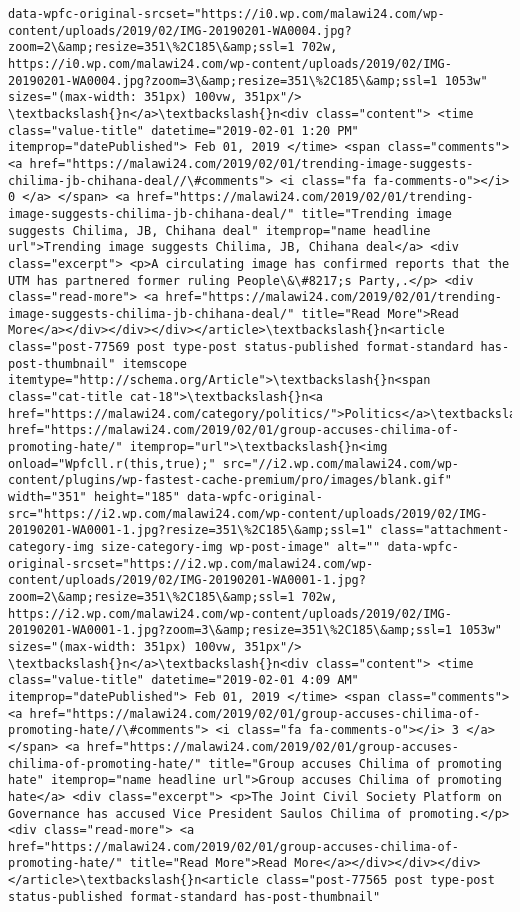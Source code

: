 \documentclass[11pt]{article}
\begin{document}
\begin{Verbatim}[commandchars=\\\{\}]
data-wpfc-original-srcset="https://i0.wp.com/malawi24.com/wp-content/uploads/2019/02/IMG-20190201-WA0004.jpg?zoom=2\&amp;resize=351\%2C185\&amp;ssl=1 702w, https://i0.wp.com/malawi24.com/wp-content/uploads/2019/02/IMG-20190201-WA0004.jpg?zoom=3\&amp;resize=351\%2C185\&amp;ssl=1 1053w" sizes="(max-width: 351px) 100vw, 351px"/>   \textbackslash{}n</a>\textbackslash{}n<div class="content"> <time class="value-title" datetime="2019-02-01 1:20 PM" itemprop="datePublished"> Feb 01, 2019 </time> <span class="comments"> <a href="https://malawi24.com/2019/02/01/trending-image-suggests-chilima-jb-chihana-deal//\#comments"> <i class="fa fa-comments-o"></i> 0 </a> </span> <a href="https://malawi24.com/2019/02/01/trending-image-suggests-chilima-jb-chihana-deal/" title="Trending image suggests Chilima, JB, Chihana deal" itemprop="name headline url">Trending image suggests Chilima, JB, Chihana deal</a> <div class="excerpt"> <p>A circulating image has confirmed reports that the UTM has partnered former ruling People\&\#8217;s Party,.</p> <div class="read-more"> <a href="https://malawi24.com/2019/02/01/trending-image-suggests-chilima-jb-chihana-deal/" title="Read More">Read More</a></div></div></div></article>\textbackslash{}n<article class="post-77569 post type-post status-published format-standard has-post-thumbnail" itemscope itemtype="http://schema.org/Article">\textbackslash{}n<span class="cat-title cat-18">\textbackslash{}n<a href="https://malawi24.com/category/politics/">Politics</a>\textbackslash{}n</span>\textbackslash{}n<a href="https://malawi24.com/2019/02/01/group-accuses-chilima-of-promoting-hate/" itemprop="url">\textbackslash{}n<img onload="Wpfcll.r(this,true);" src="//i2.wp.com/malawi24.com/wp-content/plugins/wp-fastest-cache-premium/pro/images/blank.gif" width="351" height="185" data-wpfc-original-src="https://i2.wp.com/malawi24.com/wp-content/uploads/2019/02/IMG-20190201-WA0001-1.jpg?resize=351\%2C185\&amp;ssl=1" class="attachment-category-img size-category-img wp-post-image" alt="" data-wpfc-original-srcset="https://i2.wp.com/malawi24.com/wp-content/uploads/2019/02/IMG-20190201-WA0001-1.jpg?zoom=2\&amp;resize=351\%2C185\&amp;ssl=1 702w, https://i2.wp.com/malawi24.com/wp-content/uploads/2019/02/IMG-20190201-WA0001-1.jpg?zoom=3\&amp;resize=351\%2C185\&amp;ssl=1 1053w" sizes="(max-width: 351px) 100vw, 351px"/>   \textbackslash{}n</a>\textbackslash{}n<div class="content"> <time class="value-title" datetime="2019-02-01 4:09 AM" itemprop="datePublished"> Feb 01, 2019 </time> <span class="comments"> <a href="https://malawi24.com/2019/02/01/group-accuses-chilima-of-promoting-hate//\#comments"> <i class="fa fa-comments-o"></i> 3 </a> </span> <a href="https://malawi24.com/2019/02/01/group-accuses-chilima-of-promoting-hate/" title="Group accuses Chilima of promoting hate" itemprop="name headline url">Group accuses Chilima of promoting hate</a> <div class="excerpt"> <p>The Joint Civil Society Platform on Governance has accused Vice President Saulos Chilima of promoting.</p> <div class="read-more"> <a href="https://malawi24.com/2019/02/01/group-accuses-chilima-of-promoting-hate/" title="Read More">Read More</a></div></div></div></article>\textbackslash{}n<article class="post-77565 post type-post status-published format-standard has-post-thumbnail" 
\end{Verbatim}
\end{document}
